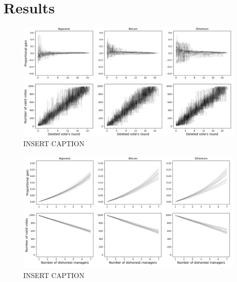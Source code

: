 \section{Results}
\label{sec:results}


\begin{figure}[h]
	\centering
	\includegraphics[width=\linewidth]{img/deleter}
	\caption{INSERT CAPTION}
	\label{fig:deleter}
\end{figure}

\begin{figure}[h]
	\centering
	\includegraphics[width=\linewidth]{img/rejecter}
	\caption{INSERT CAPTION}
	\label{fig:rejecter}
\end{figure}